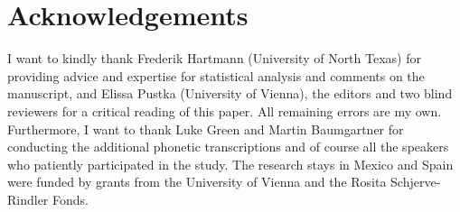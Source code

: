 \documentclass[output=paper]{langscibook}
\begin{document}
\section*{Acknowledgements}
I want to kindly thank Frederik Hartmann (University of North Texas) for providing advice and expertise for statistical analysis and comments on the manuscript, and Elissa Pustka (University of Vienna), the editors and two blind reviewers for a critical reading of this paper. All remaining errors are my own. Furthermore, I want to thank Luke Green and Martin Baumgartner for conducting the additional phonetic transcriptions and of course all the speakers who patiently participated in the study. The research stays in Mexico and Spain were funded by grants from the University of Vienna and the Rosita Schjerve-Rindler Fonds.




\printbibliography[heading=subbibliography,notkeyword=this]
\end{document}
